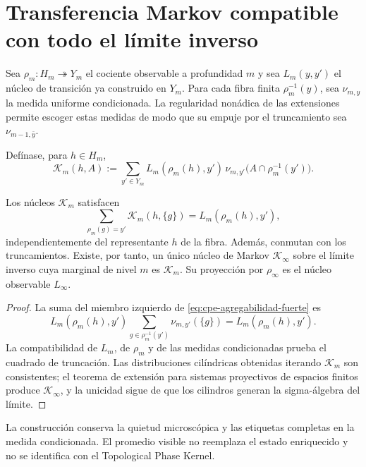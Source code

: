 \section{Transferencia Markov compatible con todo el límite inverso}
\label{sec:cpe-transferencia-limite-inverso}

Sea \(\rho_m:H_m\twoheadrightarrow Y_m\) el cociente observable a profundidad
\(m\) y sea \(L_m(y,y')\) el núcleo de transición ya construido en
\(Y_m\). Para cada fibra finita \(\rho_m^{-1}(y)\), sea
\(\nu_{m,y}\) la medida uniforme condicionada. La regularidad nonádica de
las extensiones permite escoger estas medidas de modo que su empuje por el
truncamiento sea \(\nu_{m-1,\bar y}\).

Defínase, para \(h\in H_m\),
\begin{equation}
 \mathcal K_m(h,A)
 :=\sum_{y'\in Y_m}
 L_m(\rho_m(h),y')\,
 \nu_{m,y'}\bigl(A\cap\rho_m^{-1}(y')\bigr).
 \label{eq:cpe-kernel-lift-uniforme}
\end{equation}

\begin{theorem}
\label{thm:cpe-kernel-proyectivo}
Los núcleos \(\mathcal K_m\) satisfacen
\begin{equation}
 \sum_{\rho_m(g)=y'}\mathcal K_m(h,\{g\})
 =L_m(\rho_m(h),y'),
 \label{eq:cpe-agregabilidad-fuerte}
\end{equation}
independientemente del representante \(h\) de la fibra. Además, conmutan con
los truncamientos. Existe, por tanto, un único núcleo de Markov
\(\mathcal K_\infty\) sobre el límite inverso cuya marginal de nivel \(m\)
es \(\mathcal K_m\). Su proyección por \(\rho_\infty\) es el núcleo
observable \(L_\infty\).
\end{theorem}

\begin{proof}
La suma del miembro izquierdo de
\eqref{eq:cpe-agregabilidad-fuerte} es
\[
 L_m(\rho_m(h),y')
 \sum_{g\in\rho_m^{-1}(y')}\nu_{m,y'}(\{g\})
 =L_m(\rho_m(h),y').
\]
La compatibilidad de \(L_m\), de \(\rho_m\) y de las medidas condicionadas
prueba el cuadrado de truncación. Las distribuciones cilíndricas obtenidas
iterando \(\mathcal K_m\) son consistentes; el teorema de extensión para
sistemas proyectivos de espacios finitos produce \(\mathcal K_\infty\), y
la unicidad sigue de que los cilindros generan la sigma-álgebra del límite.
\end{proof}

La construcción conserva la quietud microscópica y las etiquetas completas
en la medida condicionada. El promedio visible no reemplaza el estado
enriquecido y no se identifica con el Topological Phase Kernel.

